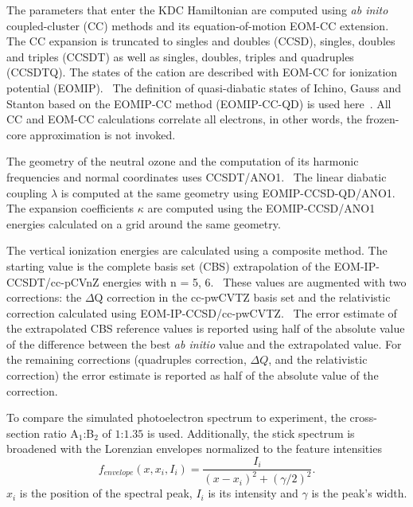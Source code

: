 \documentclass[
12pt,
a4paper,
prb,
superscriptaddress,
]{revtex4}
\begin{document}
The parameters that enter the KDC Hamiltonian are computed using \emph{ab
inito} coupled-cluster (CC) methods and its equation-of-motion EOM-CC
extension.~\cite{Bartlett:CC_review:07, Krylov:EOMRev:07, Bartlett:Book:09,
Christiansen:EOMRev:11, Bartlet:EOMRev:12, Krylov:OSRev} The CC expansion is
truncated to singles and doubles (CCSD), singles, doubles and triples (CCSDT)
as well as singles, doubles, triples and quadruples
(CCSDTQ).\cite{Matthews:ncc:2015}  The states of the cation are described with
EOM-CC for ionization potential (EOMIP).~\cite{StantonGauss:EOMIP:99} The
definition of quasi-diabatic states of Ichino, Gauss and Stanton based on the
EOMIP-CC method (EOMIP-CC-QD) is used here~\cite{Stanton:EOMIPdeg:09}. All CC
and EOM-CC calculations correlate all electrons, in other words, the
frozen-core approximation is not invoked.

The geometry of the neutral ozone and the computation of its harmonic
frequencies and normal coordinates uses
CCSDT/ANO1.~\cite{Almlof:ANO,Almlof:ANO:1988} 
The linear diabatic coupling $\lambda$ is computed at the same geometry using
EOMIP-CCSD-QD/ANO1. The expansion coefficients $\kappa$ are computed using the
EOMIP-CCSD/ANO1 energies calculated on a grid around the same geometry.

The vertical ionization energies are calculated using a composite method.  The
starting value is the complete basis set (CBS) extrapolation of the
EOM-IP-CCSDT/cc-pCVnZ energies with n = 5, 6.~\cite{Woon:95:CCBS} These values
are augmented with two corrections: the $\Delta$Q correction in the cc-pwCVTZ
basis set and the relativistic correction calculated using
EOM-IP-CCSD/cc-pwCVTZ.~\cite{Dunning:02:p(w)CVnZ} The error estimate of the
extrapolated CBS reference values is reported using half of the absolute value
of the difference between the best \emph{ab initio} value and the extrapolated
value.  For the remaining corrections (quadruples correction, $\Delta Q$, and
the relativistic correction) the error estimate is reported as half of the
absolute value of the correction.

To compare the simulated photoelectron spectrum to experiment, the
cross-section ratio A$_1$:B$_2$ of $1$:$1.35$ is used.\cite{KDC:O3:92}
Additionally, the stick spectrum is broadened with the Lorenzian envelopes
normalized to the feature intensities
\begin{equation}
    f _{envelope}(x, x _i, I _i) = 
    \frac{I_i}{(x-x _i)^2 + (\gamma/ 2) ^2}.
    \label{eq:lorentzian}
\end{equation}
$x _i$ is the position of the spectral peak, $I _i$ is its intensity and
$\gamma$ is the peak's width.
\end{document}
